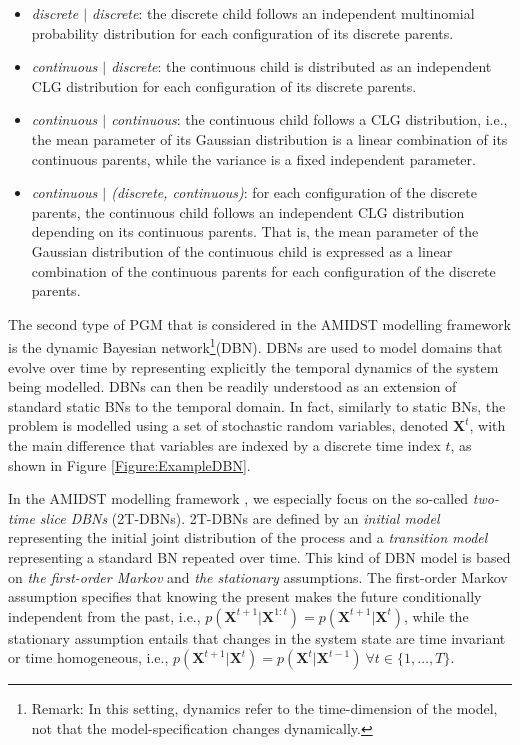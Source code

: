 \begin{itemize}
\item \emph{discrete $\mid$ discrete}: the discrete child follows an independent multinomial probability distribution for each configuration of its discrete parents.

\item \emph{continuous $\mid$ discrete}: the continuous child is distributed as an independent CLG distribution for each configuration of its discrete parents. 

\item \emph{continuous $\mid$ continuous}: the continuous child follows a CLG distribution, i.e., the mean parameter of its Gaussian distribution is a linear combination of its continuous parents, while the variance is a fixed independent parameter. 

\item \emph{continuous $\mid$ (discrete, continuous)}: for each configuration of the discrete parents, the continuous child follows an independent CLG distribution depending on its continuous parents. That is, the mean parameter of the Gaussian distribution of the continuous child is expressed as a linear combination of the continuous parents for each configuration of the discrete parents.
\end{itemize}
 

The second type of PGM that is considered in the AMIDST modelling framework is the dynamic Bayesian network\footnote{Remark: In this setting, dynamics refer to the time-dimension of the model, not that the model-specification changes dynamically.}(DBN)\cite{DeanKanazawa1989}. DBNs are used to model domains that evolve over time by representing explicitly the temporal dynamics of the system being modelled. DBNs can then be readily understood as an extension of standard static BNs to the temporal domain. In fact, similarly to static BNs, the problem is modelled using a set of stochastic random variables, denoted $\mathbf{X}^t$, with the main difference that variables are indexed by a discrete time index $t$, as shown in Figure \ref{Figure:ExampleDBN}.

In the AMIDST modelling framework \cite{Deliverable2.1},  we especially focus on the so-called \textit{two-time slice DBNs} (2T-DBNs). 2T-DBNs are defined by an \textit{initial model} representing the initial joint distribution of the process and a \textit{transition model} representing a standard BN repeated over time. This kind of DBN model is based on \textit{the first-order Markov} and \textit{the stationary} assumptions. The first-order Markov assumption specifies that knowing the present makes the future conditionally independent from the past, i.e., $p(\bm X^{t+1} | \bm X^{1:t})  = p(\bm X^{t+1} | \bm X^{t})$, while the stationary assumption entails that changes in the system state are time invariant or time homogeneous, i.e., $p(\bm X^{t+1}|\bm X^{t}) = p(\bm X^t|\bm X^{t-1})\ \forall t \in\{1,\ldots,T\}$. 

